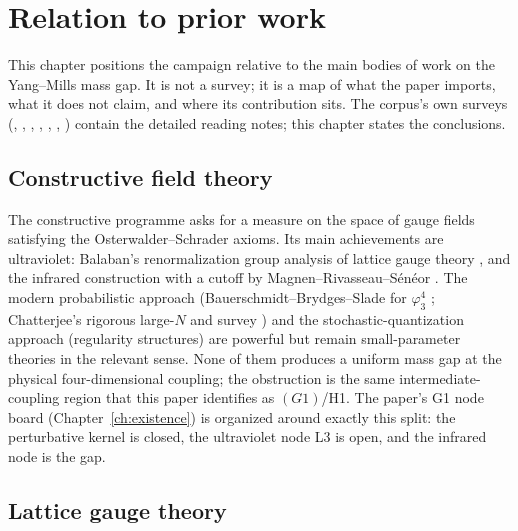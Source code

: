 \section{Relation to prior work}
\label{ch:related}

This chapter positions the campaign relative to the main bodies of work on the Yang--Mills mass
gap. It is not a survey; it is a map of what the paper imports, what it does not claim, and where
its contribution sits. The corpus's own surveys (,
, , ,
, ,
) contain the detailed reading notes; this chapter states the
conclusions.

\subsection{Constructive field theory}

The constructive programme asks for a measure on the space of gauge fields satisfying the
Osterwalder--Schrader axioms. Its main achievements are ultraviolet: Balaban's renormalization
group analysis of lattice gauge theory \cite{balaban}, and the infrared construction with a
cutoff by Magnen--Rivasseau--S\'en\'eor \cite{mrs}. The modern probabilistic approach
(Bauerschmidt--Brydges--Slade for $\varphi^4_3$ \cite{bbs}; Chatterjee's rigorous large-$N$ and
survey \cite{chatterjee}) and the stochastic-quantization approach (regularity structures) are
powerful but remain small-parameter theories in the relevant sense. None of them produces a
uniform mass gap at the physical four-dimensional coupling; the obstruction is the same
intermediate-coupling region that this paper identifies as $(G1)$/H1. The paper's G1 node board
(Chapter~\ref{ch:existence}) is organized around exactly this split: the perturbative kernel is
closed, the ultraviolet node L3 is open, and the infrared node is the gap.

\subsection{Lattice gauge theory}


